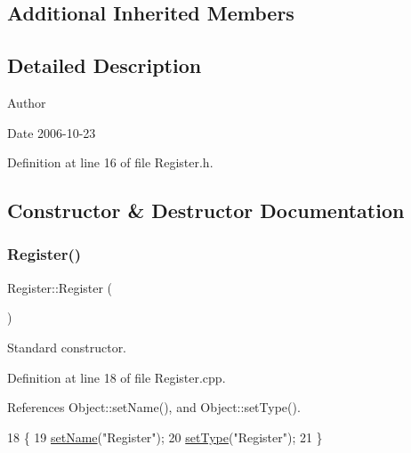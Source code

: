 \subsection*{Additional Inherited Members}


\subsection{Detailed Description}
\begin{DoxyAuthor}{Author}

\end{DoxyAuthor}
\begin{DoxyDate}{Date}
2006-\/10-\/23 
\end{DoxyDate}


Definition at line 16 of file Register.\+h.



\subsection{Constructor \& Destructor Documentation}
\mbox{\label{classRegister_a669b96861697fb8c04bce79f04390c66}} 
\subsubsection{\texorpdfstring{Register()}{Register()}}
{\footnotesize\ttfamily Register\+::\+Register (\begin{DoxyParamCaption}{ }\end{DoxyParamCaption})}



Standard constructor. 



Definition at line 18 of file Register.\+cpp.



References Object\+::set\+Name(), and Object\+::set\+Type().


\begin{DoxyCode}
18                      \{
19   \hyperlink{classObject_ae30fea75683c2d149b6b6d17c09ecd0c}{setName}(\textcolor{stringliteral}{"Register"});
20   \hyperlink{classObject_aae534cc9d982bcb9b99fd505f2e103a5}{setType}(\textcolor{stringliteral}{"Register"});
21 \}
\end{DoxyCode}
\mbox{\label{classRegister_a27490bda19cd4bd6ca09b48a795fc060}} 
